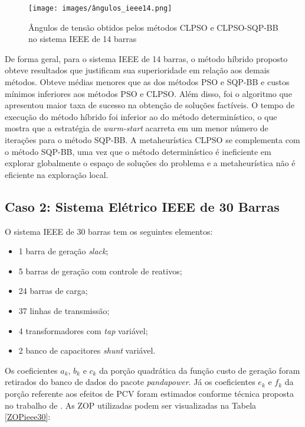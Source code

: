 \documentclass[
	12pt,				%
	openany,			%
	twoside,			%
	a4paper,			%
	chapter=TITLE,		%
	section=Title,		%
	subsection=Title,	%
	subsubsection=Title,%
	english,			%
	french,				%
	spanish,			%
	brazil			%
	]{abntex2}
\begin{document}
\begin{ERRATA}
\begin{figure}[h]
    \caption{\label{ieee_14_ang}Ângulos de tensão obtidos pelos métodos CLPSO e CLPSO-SQP-BB no sistema IEEE de 14 barras}
    \centering
    \texttt{[image: images/ângulos\_ieee14.png]}
   
\end{figure}


De forma geral, para o sistema IEEE de 14 barras, o método híbrido proposto obteve resultados que justificam sua superioridade em relação aos demais métodos. Obteve médias menores que as dos métodos PSO e SQP-BB e custos mínimos inferiores aos métodos PSO e CLPSO. Além disso, foi o algoritmo que apresentou maior taxa de sucesso na obtenção de soluções factíveis.  O tempo de execução do método híbrido foi inferior ao do método determinístico, o que mostra que a estratégia de \emph{warm-start} acarreta em um menor número de iterações para o método SQP-BB. A metaheurística CLPSO se complementa com o método SQP-BB, uma vez que o método determinístico é ineficiente em explorar globalmente o espaço de soluções do problema e a metaheurística não é eficiente na exploração local. 


\subsection{Caso 2: Sistema Elétrico IEEE de 30 Barras}


O sistema IEEE de 30 barras tem os seguintes elementos:

\begin{itemize}
    \item 1 barra de geração \emph{slack};
    \item 5 barras de geração com controle de reativos;
    \item 24 barras de carga;
    \item 37 linhas de transmissão;
    \item 4 transformadores com \emph{tap} variável;
    \item 2 banco de capacitores \emph{shunt} variável.
\end{itemize}

Os coeficientes $a_k$, $b_k$ e $c_k$ da porção quadrática da função custo de geração foram retirados do banco de dados do pacote \emph{pandapower}. Já os coeficientes $e_k$ e $f_k$ da porção referente aos efeitos de PCV foram estimados conforme técnica proposta no trabalho de . As ZOP utilizadas podem ser visualizadas na Tabela \ref{ZOPieee30}:



\end{ERRATA}
\end{document}

